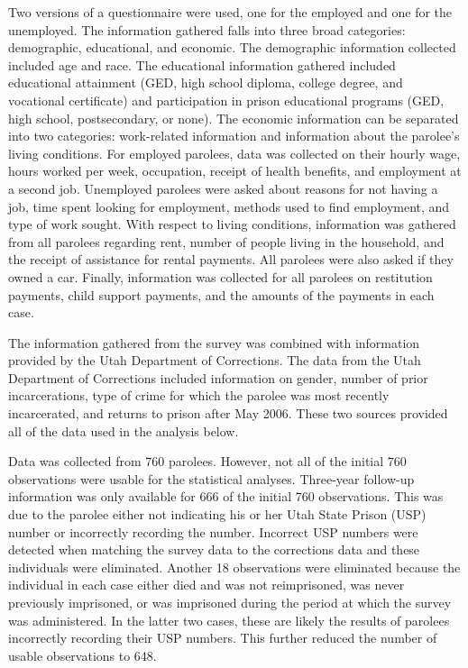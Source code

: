 Two versions of a questionnaire were used, one for the employed and one for the unemployed.  The information gathered falls into three broad categories:  demographic, educational, and economic.  The demographic information collected included age and race.  The educational information gathered included educational attainment (GED, high school diploma, college degree, and vocational certificate) and participation in prison educational programs (GED, high school, postsecondary, or none).  The economic information can be separated into two categories:  work-related information and information about the parolee's living conditions.  For employed parolees, data was collected on their hourly wage, hours worked per week, occupation, receipt of health benefits, and employment at a second job.  Unemployed parolees were asked about reasons for not having a job, time spent looking for employment, methods used to find employment, and type of work sought.  With respect to living conditions, information was gathered from all parolees regarding rent, number of people living in the household, and the receipt of assistance for rental payments.  All parolees were also asked if they owned a car.  Finally, information was collected for all parolees on restitution payments, child support payments, and the amounts of the payments in each case.

The information gathered from the survey was combined with information provided by the Utah Department of Corrections. The data from the Utah Department of Corrections included information on gender, number of prior incarcerations, type of crime for which the parolee was most recently incarcerated, and returns to prison after May 2006.  These two sources provided all of the data used in the analysis below.

Data was collected from 760 parolees.  However, not all of the initial 760 observations were usable for the statistical analyses.  Three-year follow-up information was only available for 666 of the initial 760 observations.  This was due to the parolee either not indicating his or her Utah State Prison (USP) number or incorrectly recording the number.  Incorrect USP numbers were detected when matching the survey data to the corrections data and these individuals were eliminated.  Another 18 observations were eliminated because the individual in each case either died and was not reimprisoned, was never previously imprisoned, or was imprisoned during the period at which the survey was administered.  In the latter two cases, these are likely the results of parolees incorrectly recording their USP numbers.  This further reduced the number of usable observations to 648.

